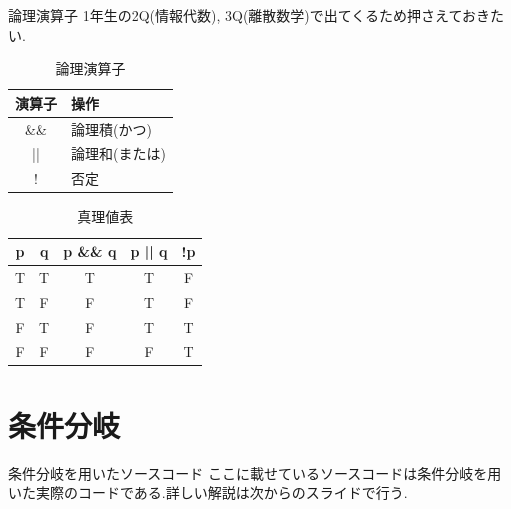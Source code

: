 \begin{frame}{論理演算子}
1年生の2Q(情報代数), 3Q(離散数学)で出てくるため押さえておきたい.
    \begin{table}[]
        \centering
        \begin{tabular}{|c|l|}
        \hline
        演算子 & 操作\\
        \hline
        \&\& & 論理積(かつ)\\
        || & 論理和(または)\\
        ! & 否定\\
        \hline
        \end{tabular}
        \caption{論理演算子}
        \label{tab:my_label}
    \end{table}
    \begin{table}[]
        \centering
        \begin{tabular}{|c|c|c|c|c|}
        \hline
        p & q & p \&\& q & p || q & !p\\
        \hline
        T & T & T & T & F\\
        T & F & F & T & F\\
        F & T & F & T & T\\
        F & F & F & F & T\\
        \hline
        \end{tabular}
        \caption{真理値表}
        \label{tab:my_label}
    \end{table}
\end{frame}

\section{条件分岐}
\begin{frame}[fragile]{条件分岐を用いたソースコード}
    ここに載せているソースコードは条件分岐を用いた実際のコードである.詳しい解説は次からのスライドで行う.
    \begin{minipage}{\linewidth}
        
    \end{minipage}

\end{frame}

